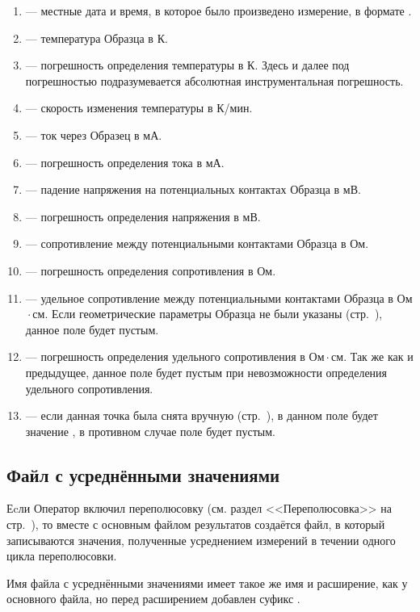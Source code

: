\documentclass[12pt, a4paper, twocolumn]{report}
\begin{document}
\begin{enumerate}
\item {} --- местные дата и время, в которое было произведено измерение, в формате \mbox{}.
\item {} --- температура Образца в К.
\item \CMD{+/-} --- погрешность определения температуры в К. Здесь и далее под погрешностью подразумевается абсолютная инструментальная погрешность.
\item {} --- скорость изменения температуры в К/мин.
\item {} --- ток через Образец в мА.
\item \CMD{+/-} --- погрешность определения тока в мА.
\item {} --- падение напряжения на потенциальных контактах Образца в мВ.
\item \CMD{+/-} --- погрешность определения напряжения в мВ.
\item {} --- сопротивление между потенциальными контактами Образца в Ом.
\item \CMD{+/-} --- погрешность определения сопротивления в Ом.
\item {} --- удельное сопротивление между потенциальными контактами Образца в Ом${}\cdot{}$см. Если геометрические параметры Образца не были указаны (стр.~\pageref{sec_geom_params}), данное поле будет пустым.
\item \CMD{+/-} --- погрешность определения удельного сопротивления в Ом${}\cdot{}$см. Так же как и предыдущее, данное поле будет пустым при невозможности определения удельного сопротивления.
\item {} --- если данная точка была снята вручную (стр.~\pageref{sec_manual}), в данном поле будет значение , в противном случае поле будет пустым.
\end{enumerate}

\subsection{Файл с усреднёнными значениями}

Еcли Оператор включил переполюсовку (см. раздел <<Переполюсовка>> на стр.~\pageref{sec_switch}), то вместе с основным файлом результатов создаётся файл, в который записываются значения, полученные усреднением измерений в течении одного цикла переполюсовки.

Имя файла с усреднёнными значениями имеет такое же имя и расширение, как у основного файла, но перед расширением добавлен суфикс .
\end{document}
